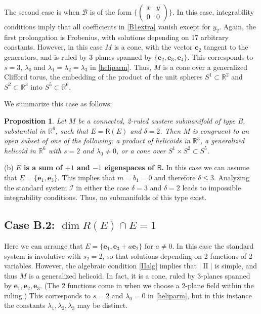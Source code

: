 \documentclass[12pt,reqno]{amsart}
\newtheorem{prop}[theorem]{Proposition}
\theoremstyle{definition}
\theoremstyle{remark}
\begin{document}
The second case is when ${\mathcal B}$ is of the form $\{ \left( \begin{smallmatrix} x & y \\0 & 0 \end{smallmatrix}\right) \}$.
In this case, integrability conditions imply that all coefficients in \eqref{B1extra} vanish except for $y_2$.  Again,
the first prolongation is Frobenius, with solutions depending on 17 arbitrary constants.
However, in this case $M$ is a cone, with the vector ${\mathbf e}_2$ tangent to the generators, and
is ruled by 3-planes spanned by $\{{\mathbf e}_2,{\mathbf e}_3,{\mathbf e}_4\}$.  This corresponds to $s=3$, $\lambda_0$ and
$\lambda_1=\lambda_2=\lambda_3$ in \eqref{heliparm}.   Thus, $M$ is a cone over a generalized
Clifford torus, the embedding
of the product of the unit spheres $S^1\subset {\mathbb R}^2$ and $S^2 \subset {\mathbb R}^3$ into $S^5 \subset {\mathbb R}^6$.

We summarize this case as follows:
\begin{prop}  Let $M$ be a connected, 2-ruled austere submanifold of type B, substantial
in ${\mathbb R}^6$, such that $E={\mathsf R}(E)$ and $\delta=2$.  Then $M$ is congruent to an open subset of one of
the following: a product  of helicoids in ${\mathbb R}^3$,
a generalized helicoid in ${\mathbb R}^6$ with $s=2$ and $\lambda_0\ne 0$, or a cone over $S^1 \times S^2 \subset S^5$.
\end{prop}

\medskip
(b) {\bf $E$ is a sum of $+1$ and $-1$ eigenspaces of ${\mathsf R}$.}
In this case we can assume that $E=\{{\mathbf e}_1, {\mathbf e}_3\}$. This implies that $m=b_1=0$ and therefore $\delta\leq 3$.
Analyzing the standard system ${{\mathcal I}}$ in either the case $\delta=3$ and $\delta=2$ leads
to impossible integrability conditions.  Thus, no submanifolds of this type exist.

\subsection*{Case B.2: $\dim R(E)\cap E=1$}  Here we can arrange that $E=\{{\mathbf e}_1, {\mathbf e}_3+a{\mathbf e}_2\}$ for $a\ne 0$.
In this case the standard system is involutive with $s_2=2$, so that
solutions depending on 2 functions of 2 variables.  However, the algebraic condition \eqref{IIalg}
implies that $|{\operatorname{II}} |$ is simple, and thus $M$ is a generalized helicoid.  In fact, it is a cone, ruled by 3-planes
spanned by ${\mathbf e}_1,{\mathbf e}_2, {\mathbf e}_3$.  (The 2 functions come in when we choose a 2-plane field within the ruling.)
This corresponds to $s=2$ and $\lambda_0=0$ in \eqref{heliparm}, but in this instance the constants
$\lambda_1, \lambda_2, \lambda_3$ may be distinct.
\end{document}
